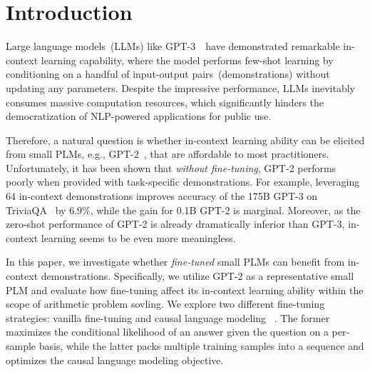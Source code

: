 \section{Introduction}
\label{sec:intro}

Large language models~(LLMs) like GPT-3~\cite{gpt3,cot}~have demonstrated remarkable in-context learning capability, where the model performs few-shot learning by conditioning on a handful of
 input-output pairs~(demonstrations) without updating any parameters. Despite the impressive performance, LLMs inevitably consumes massive computation resources, which significantly hinders the 
 democratization of NLP-powered applications for public use.

Therefore, a natural question is whether in-context learning ability can be elicited from small PLMs, e.g., GPT-2~\cite{gpt2}, that are affordable to most practitioners. 
Unfortunately, it has been shown that \textit{without fine-tuning}, GPT-2 performs poorly when provided with task-specific demonstrations. For example, leveraging $64$ in-context demonstrations improves accuracy of the 175B GPT-3 on TriviaQA~\cite{triviaqa} by $6.9\%$, while the gain for 0.1B GPT-2 is marginal. 
Moreover, as the zero-shot performance of GPT-2 is already dramatically inferior than GPT-3, in-context learning seems to be even more meaningless.


In this paper, we investigate whether \textit{fine-tuned} small PLMs can benefit from in-context demonstrations. Specifically, we utilize GPT-2 as a representative small PLM and evaluate how fine-tuning affect its in-context learning ability within the scope of arithmetic problem sovling. 
We explore two different fine-tuning strategies: vanilla fine-tuning and causal language modeling~\cite{gpt2} . The former maximizes the conditional likelihood of an answer given the question on a per-sample basis, while the latter 
packs multiple training samples into a sequence and optimizes the causal language modeling objective. 

